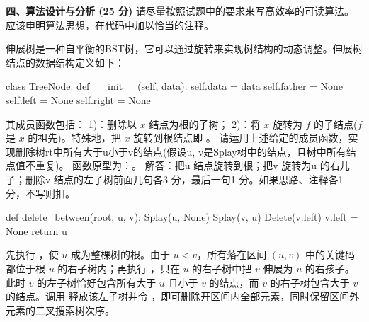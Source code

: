 \textbf{四、算法设计与分析 (25 分)}
请尽量按照试题中的要求来写高效率的可读算法。应该申明算法思想，在代码中加以恰当的注释。
\begin{question}
伸展树是一种自平衡的BST树，它可以通过旋转来实现树结构的动态调整。伸展树结点的数据结构定义如下：
\begin{pycode}
class TreeNode:
    def __init__(self, data):
        self.data = data
        self.father = None
        self.left = None
        self.right = None
\end{pycode}
其成员函数包括：
1)\texttt{}：删除以 $x$ 结点为根的子树；
2)\texttt{}：将 $x$ 旋转为 $f$ 的子结点($f$ 是 $x$ 的祖先)。特殊地，把 $x$ 旋转到根结点即 \texttt{}。
请运用上述给定的成员函数，实现删除树rt中所有大于u小于v的结点(假设u, v是Splay树中的结点，且树中所有结点值不重复)。
函数原型为：\texttt{}。
解答：把u 结点旋转到根；把v 旋转为u 的右儿子；删除v 结点的左子树前面几句各3 分，最后一句1 分。如果思路、注释各1 分，不写则扣。
\begin{pycode}
def delete_between(root, u, v):
    Splay(u, None)
    Splay(v, u)
    Delete(v.left)
    v.left = None
    return u
\end{pycode}

\begin{solution}
先执行 \texttt{}，使 $u$ 成为整棵树的根。由于 $u<v$，所有落在区间 $(u,v)$ 中的关键码都位于根 $u$ 的右子树内；再执行 \texttt{}，只在 $u$ 的右子树中把 $v$ 伸展为 $u$ 的右孩子。此时 $v$ 的左子树恰好包含所有大于 $u$ 且小于 $v$ 的结点，而 $v$ 的右子树包含大于 $v$ 的结点。调用 \texttt{} 释放该左子树并令 \texttt{}，即可删除开区间内全部元素，同时保留区间外元素的二叉搜索树次序。
\end{solution}
\end{question}
